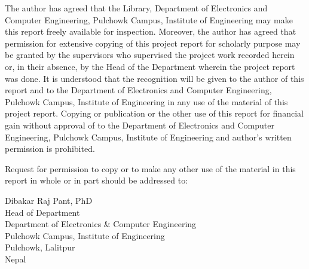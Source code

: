 \vspace{0.5cm}

The author has agreed that the Library, Department of Electronics and Computer Engineering, Pulchowk Campus, Institute of Engineering may make this report freely available for inspection. Moreover, the author has agreed that permission for extensive copying of this project report for scholarly purpose may be granted by the supervisors who supervised the project work recorded herein or, in their absence, by the Head of the Department wherein the project report was done. It is understood that the recognition will be given to the author of this report and to the Department of Electronics and Computer Engineering, Pulchowk Campus, Institute of Engineering in any use of the material of this project report. Copying or publication or the other use of this report for financial gain without approval of to the Department of Electronics and Computer Engineering, Pulchowk Campus, Institute of Engineering and author’s written permission is prohibited.

Request for permission to copy or to make any other use of the material in this report in whole or in part should be addressed to:

\vspace{0.2cm}
\begin{flushleft}

Dibakar Raj Pant, PhD\\
Head of Department\\
Department of Electronics \& Computer Engineering\\
Pulchowk Campus, Institute of Engineering\\
Pulchowk, Lalitpur\\
Nepal
\end{flushleft}

